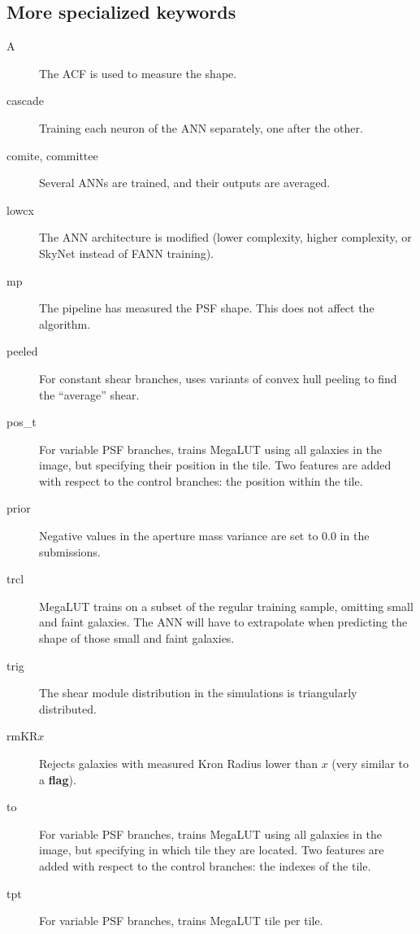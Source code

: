 \documentclass[a4paper,11pt]{scrartcl}
\begin{document}
\subsection{More specialized keywords}
\begin{description}

\item [A] The ACF is used to measure the shape.
\item [cascade] Training each neuron of the ANN separately, one after the other.
\item [comite, committee] Several ANNs are trained, and their outputs are averaged.
\item [lowcx] The ANN architecture is modified (lower complexity, higher complexity, or SkyNet instead of FANN training).
\item [mp] The pipeline has measured the PSF shape. This does not affect the algorithm.  
\item [peeled] For constant shear branches, uses variants of convex hull peeling to find the ``average'' shear.
\item [pos\_t] For variable PSF branches, trains MegaLUT using all galaxies in the image, but specifying their position in the tile. Two features are added with respect to the control branches: the position within the tile.
\item [prior] Negative values in the aperture mass variance are set to 0.0 in the submissions.
\item [trcl] MegaLUT trains on a subset of the regular training sample, omitting small and faint galaxies. The ANN will have to extrapolate when predicting the shape of those small and faint galaxies.
\item [trig] The shear module distribution in the simulations is triangularly distributed.
\item [rmKR$x$] Rejects galaxies with measured Kron Radius lower than $x$ (very similar to a {\bf flag}).
\item [to] For variable PSF branches, trains MegaLUT using all galaxies in the image, but specifying in which tile they are located. Two features are added with respect to the control branches: the indexes of the tile.
\item [tpt] For variable PSF branches, trains MegaLUT tile per tile.

\end{description}



\end{document}
